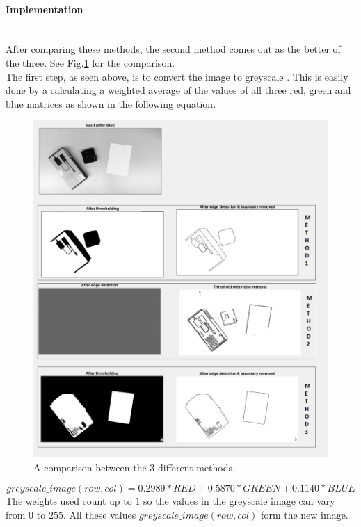 \documentclass[11pt]{article}
\begin{document}
\paragraph{Implementation}\mbox{}\\
After comparing these methods, the second method comes out as the better of the three. See Fig.\ref{fig:comparison_methods} for the comparison.\\
The first step, as seen above, is to convert the image to greyscale \cite{greyscale}. This is easily done by a calculating a weighted average of the values of all three red, green and blue matrices as shown in the following equation.
\begin{figure}[h]
	\center
  \includegraphics[width=0.7\linewidth]{comparison_methods.png}
  \caption{A comparison between the 3 different methods.}
  \label{fig:comparison_methods}
\end{figure}
\begin{equation}
greyscale\_image(row, col) = 0.2989 * RED + 0.5870 * GREEN + 0.1140 * BLUE
\end{equation}
The weights used count up to $1$ so the values in the greyscale image can vary from $0$ to $255$. All these values $greyscale\_image(row, col)$ form the new image.
\end{document}
